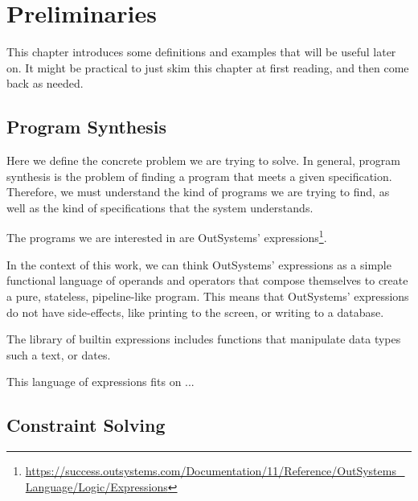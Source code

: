 \chapter{Preliminaries}
\label{chapter:preliminaries}

This chapter introduces some definitions and examples that will be useful later
on. It might be practical to just skim this chapter at first reading, and then
come back as needed.

\section{Program Synthesis}
\label{sec:program-synthesis}

Here we define the concrete problem we are trying to solve. In general, program
synthesis is the problem of finding a program that meets a given specification.
Therefore, we must understand the kind of programs we are trying to find, as
well as the kind of specifications that the system understands.


The programs we are interested in are OutSystems'
expressions\footnote{\url{https://success.outsystems.com/Documentation/11/Reference/OutSystems_Language/Logic/Expressions}}.

In the context of this work, we can think OutSystems' expressions as a simple
functional language of operands and operators that compose themselves to create
a pure, stateless, pipeline-like program. This means that OutSystems'
expressions do not have side-effects, like printing to the screen, or writing to
a database.


The library of builtin expressions includes functions that manipulate data types
such a text, or dates. 

This language of expressions fits on ...


\section{Constraint Solving}
\label{sec:preliminaries-constraint-solving}

